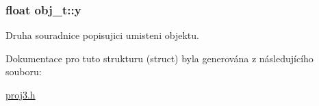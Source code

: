 \subsubsection[{\texorpdfstring{y}{y}}]{\setlength{\rightskip}{0pt plus 5cm}float obj\+\_\+t\+::y}\hypertarget{structobj__t_a1101f5b48ee96a247c71aa8a33feb2bb}{}\label{structobj__t_a1101f5b48ee96a247c71aa8a33feb2bb}
Druha souradnice popisujici umisteni objektu. 

Dokumentace pro tuto strukturu (struct) byla generována z následujícího souboru\+:\begin{DoxyCompactItemize}
\item 
\hyperlink{proj3_8h}{proj3.\+h}\end{DoxyCompactItemize}

